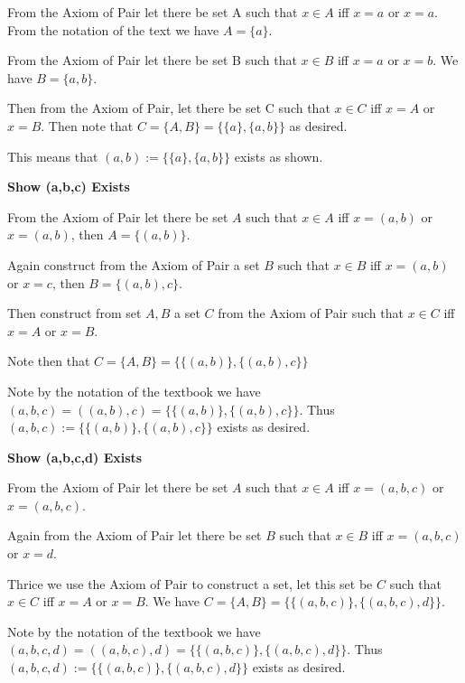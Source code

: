 \documentclass{article}
\begin{document}
From the Axiom of Pair let there be set A such that $x \in A$ iff $x = a$ or $x = a$. 
From the notation of the text we have $A = \{a\}$. 

\medskip

From the Axiom of Pair let there be set B such that $x \in B$ iff $x = a$ or $x = b$.
We have $B = \{a,b\}$.

\medskip

Then from the Axiom of Pair, let there be set C such that $x \in C$ iff $x = A$ or $x = B$. Then note that $C = \{A,B\} = \{\{a\},\{a,b\}\}$ as desired.

\medskip

This means that $(a,b) := \{\{a\},\{a,b\}\}$ exists as shown.

\medskip
\textbf{Show (a,b,c) Exists}
\medskip

\medskip

From the Axiom of Pair let there be set $A$ such that $x \in A$ iff $x = (a,b)$ or $x = (a,b)$, then $A = \{(a,b)\}$.

Again construct from the Axiom of Pair a set $B$ such that $x \in B$ iff $x = (a,b)$ or $x = c$, then $B = \{(a,b),c\}$.

\medskip

Then construct from set $A,B$ a set $C$ from the Axiom of Pair such that $x \in C$ iff $x = A$ or $x = B$. 

\medskip

Note then that $C = \{A,B\} = \{\{(a,b)\},\{(a,b),c\}\}$


\medskip

Note by the notation of the textbook we have $(a,b,c) = ((a,b),c) = \{\{(a,b)\}, \{(a,b),c\}\}$. Thus $(a,b,c) := \{\{(a,b)\},\{(a,b),c\}\}$ exists as desired.

\medskip
\textbf{Show (a,b,c,d) Exists}
\medskip

From the Axiom of Pair let there be set $A$ such that $x \in A$ iff $x = (a,b,c)$ or $x = (a,b,c)$.

\medskip

Again from the Axiom of Pair let there be set $B$ such that $x \in B$ iff $x = (a,b,c)$ or $x = d$.

\medskip


Thrice we use the Axiom of Pair to construct a set, let this set be $C$ such that $x \in C$ iff $x = A$ or $x = B$. We have $C = \{A,B\} = \{\{(a,b,c)\},\{(a,b,c),d\}\}$. 

\medskip

Note by the notation of the textbook we have $(a,b,c,d) = ((a,b,c),d) = \{\{(a,b,c)\}, \{(a,b,c),d\}\}$. Thus $(a,b,c,d) := \{\{(a,b,c)\}, \{(a,b,c),d\}\}$ exists as desired. 
\end{document}
